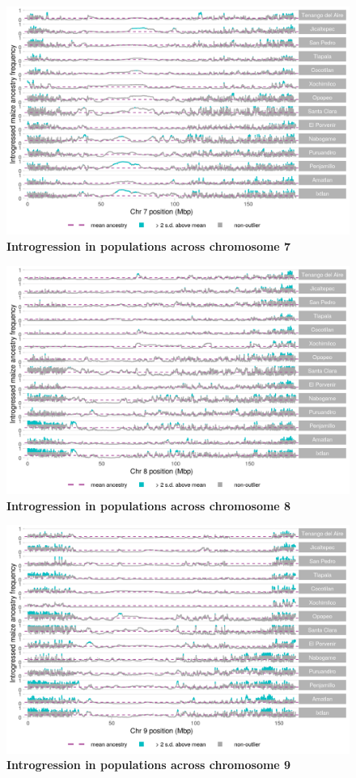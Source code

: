 \begin{figure}[ht]
\includegraphics[width=.85\textwidth]{chapter2/figures/mexicana_shared_outliers_chr_7.png}
\caption{\color{Gray} \textbf{Introgression in \mexicana populations across chromosome 7}}
\label{mexicana_chr7}
\end{figure}

\begin{figure}[ht]
\includegraphics[width=.85\textwidth]{chapter2/figures/mexicana_shared_outliers_chr_8.png}
\caption{\color{Gray} \textbf{Introgression in \mexicana populations across chromosome 8}}
\label{mexicana_chr8}
\end{figure}

\begin{figure}[ht]
\includegraphics[width=.85\textwidth]{chapter2/figures/mexicana_shared_outliers_chr_9.png}
\caption{\color{Gray} \textbf{Introgression in \mexicana populations across chromosome 9}}
\label{mexicana_chr9}
\end{figure}

